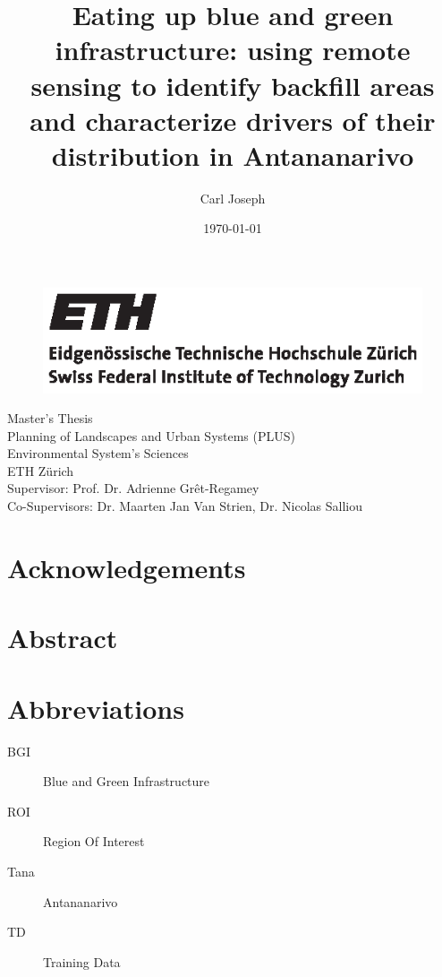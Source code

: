 \documentclass[11pt, letterpaper, oneside]{article}
\title{Eating up blue and green infrastructure: using remote sensing to identify backfill areas and characterize drivers of their distribution in Antananarivo}
\author{Carl Joseph}
\date{\today}
\begin{document}
\begin{titlepage}
\begin{figure}%
    \includegraphics{figures/eth_logo_black.eps}
\end{figure}
\maketitle

\begin{center}
\large
{Master's Thesis\\
\vspace{0.5cm}
Planning of Landscapes and Urban Systems (PLUS) \\[2pt]
Environmental System's Sciences \\[2pt]
ETH Zürich\\
\vspace{0.5cm}
Supervisor: Prof. Dr. Adrienne Grêt-Regamey\\
Co-Supervisors: Dr. Maarten Jan Van Strien, Dr. Nicolas Salliou}
\end{center}

\end{titlepage}


\section*{Acknowledgements}

\section*{Abstract}

\section*{Abbreviations}

\begin{description}
   \item[BGI]Blue and Green Infrastructure
   \item[ROI] Region Of Interest
   \item[Tana] Antananarivo
   \item[TD] Training Data
   
\end{description}
\end{document}
